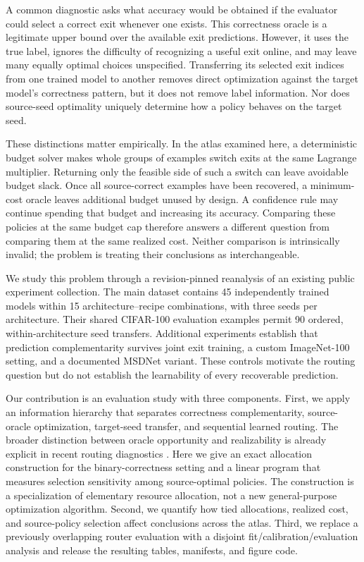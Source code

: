 \documentclass[11pt,a4paper]{article}
\begin{document}
A common diagnostic asks what accuracy would be obtained if the evaluator could select a correct exit whenever one exists. This correctness oracle is a legitimate upper bound over the available exit predictions. However, it uses the true label, ignores the difficulty of recognizing a useful exit online, and may leave many equally optimal choices unspecified. Transferring its selected exit indices from one trained model to another removes direct optimization against the target model's correctness pattern, but it does not remove label information. Nor does source-seed optimality uniquely determine how a policy behaves on the target seed.

These distinctions matter empirically. In the atlas examined here, a deterministic budget solver makes whole groups of examples switch exits at the same Lagrange multiplier. Returning only the feasible side of such a switch can leave avoidable budget slack. Once all source-correct examples have been recovered, a minimum-cost oracle leaves additional budget unused by design. A confidence rule may continue spending that budget and increasing its accuracy. Comparing these policies at the same budget cap therefore answers a different question from comparing them at the same realized cost. Neither comparison is intrinsically invalid; the problem is treating their conclusions as interchangeable.

We study this problem through a revision-pinned reanalysis of an existing public experiment collection. The main dataset contains 45 independently trained models within 15 architecture--recipe combinations, with three seeds per architecture. Their shared CIFAR-100 evaluation examples permit 90 ordered, within-architecture seed transfers. Additional experiments establish that prediction complementarity survives joint exit training, a custom ImageNet-100 setting, and a documented MSDNet variant. These controls motivate the routing question but do not establish the learnability of every recoverable prediction.

Our contribution is an evaluation study with three components. First, we apply an information hierarchy that separates correctness complementarity, source-oracle optimization, target-seed transfer, and sequential learned routing. The broader distinction between oracle opportunity and realizability is already explicit in recent routing diagnostics \citep{selection,routingnoise}. Here we give an exact allocation construction for the binary-correctness setting and a linear program that measures selection sensitivity among source-optimal policies. The construction is a specialization of elementary resource allocation, not a new general-purpose optimization algorithm. Second, we quantify how tied allocations, realized cost, and source-policy selection affect conclusions across the atlas. Third, we replace a previously overlapping router evaluation with a disjoint fit/calibration/evaluation analysis and release the resulting tables, manifests, and figure code.
\end{document}
